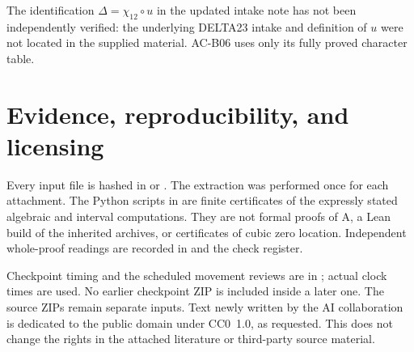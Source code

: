 \documentclass[11pt,a4paper]{article}
\theoremstyle{definition}
\theoremstyle{remark}
\begin{document}
The identification $\Delta=\chi_{12}\circ u$ in the
updated intake note has not been independently
verified: the underlying DELTA23 intake and definition
of $u$ were not located in the supplied material.
AC-B06 uses only its fully proved character table.

\appendix
\section{Evidence, reproducibility, and licensing}
Every input file is hashed in
 or
.
The extraction was performed once for each attachment.
The Python scripts in  are finite
certificates of the expressly stated algebraic and
interval computations. They are not formal proofs
of A, a Lean build of the inherited archives, or
certificates of cubic zero location. Independent
whole-proof readings are recorded in 
and the check register.

Checkpoint timing and the scheduled movement reviews
are in ; actual clock times are used.
No earlier checkpoint ZIP is included inside a later
one. The source ZIPs remain separate inputs.
Text newly written by the AI collaboration is
dedicated to the public domain under CC0~1.0, as
requested. This does not change the rights in the
attached literature or third-party source material.
\end{document}
